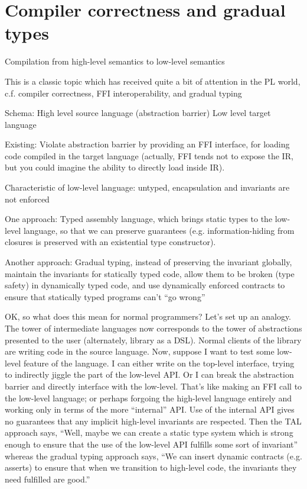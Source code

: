 \section{Compiler correctness and gradual types}\label{sec:compiler}

Compilation from high-level semantics to low-level semantics

This is a classic topic which has received quite a bit of attention in the PL world, c.f. compiler correctness, FFI interoperability, and gradual typing

Schema: High level source language (abstraction barrier) Low level target language

Existing: Violate abstraction barrier by providing an FFI interface, for loading code compiled in the target language (actually, FFI tends not to expose the IR, but you could imagine the ability to directly load inside IR).

Characteristic of low-level language: untyped, encapsulation and invariants are not enforced

One approach: Typed assembly language, which brings static types to the low-level language, so that we can preserve guarantees (e.g. information-hiding from closures is preserved with an existential type constructor).

Another approach: Gradual typing, instead of preserving the invariant globally, maintain the invariants for statically typed code, allow them to be broken (type safety) in dynamically typed code, and use dynamically enforced contracts to ensure that statically typed programs can't ``go wrong''

OK, so what does this mean for normal programmers? Let's set up an analogy. The tower of intermediate languages now corresponds to the tower of abstractions presented to the user (alternately, library as a DSL). Normal clients of the library are writing code in the source language. Now, suppose I want to test some low-level feature of the language. I can either write on the top-level interface, trying to indirectly jiggle the part of the low-level API. Or I can break the abstraction barrier and directly interface with the low-level. That's like making an FFI call to the low-level language; or perhaps forgoing the high-level language entirely and working only in terms of the more ``internal'' API. Use of the internal API gives no guarantees that any implicit high-level invariants are respected. Then the TAL approach says, ``Well, maybe we can create a static type system which is strong enough to ensure that the use of the low-level API fulfills some sort of invariant'' whereas the gradual typing approach says, ``We can insert dynamic contracts (e.g. asserts) to ensure that when we transition to high-level code, the invariants they need fulfilled are good.''
